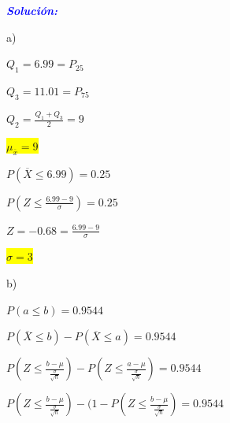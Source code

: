 \documentclass[a4paper,openright,12pt]{book}
\begin{document}
\begin{center}
	\textbf{\textit{\textcolor{blue}{Solución:}}}\\
\end{center}

{a)\\
\begin{center}
	$Q_{1}=6.99=P_{25}$\\ 
\end{center}
\begin{center}
	$Q_{3}=11.01=P_{75}$\\
\end{center}
\begin{center}
	$Q_{2}=\frac{Q_{1}+Q_{3}}{2}=9$\\
\end{center}
\begin{center}
\colorbox{yellow}{$\mu_{\overline{x}}=9$}\\
\end{center}
\begin{center}
$P(\overline{X}\leq6.99)=0.25$\\
\end{center}
\begin{center}
$P(Z\leq \frac{6.99-9}{\sigma})=0.25$\\
\end{center}
\begin{center}
$Z = -0.68 = \frac{6.99-9}{\sigma}$\\
\end{center}
\begin{center}
\colorbox{yellow}{$\sigma = 3$}\\
\end{center}
\newpage
b)\\
\begin{center}
$P(a\leq b) = 0.9544$\\
\end{center}
\begin{center}
$P(\overline{X}\leq b) - P(\overline{X} \leq a) = 0.9544$\\
\end{center}
\begin{center}
$P(Z \leq \frac{b - \mu}{\frac{\sigma}{\sqrt{n}}})-P(Z \leq \frac{a - \mu}{\frac{\sigma}{\sqrt{n}}})=0.9544$\\
\end{center}
\begin{center}
$P(Z \leq \frac{b - \mu}{\frac{\sigma}{\sqrt{n}}})-(1-P(Z \leq \frac{b - \mu}{\frac{\sigma}{\sqrt{n}}})=0.9544$\\

\end{center}}
\end{document}
